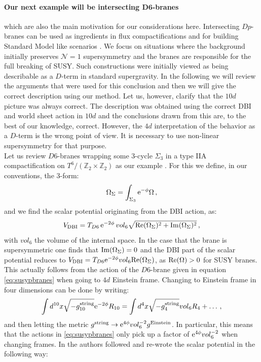\documentclass[a4paper,12pt,twoside,openright]{report}
\newcommand{\be}{\begin{equation}}
\newcommand{\ee}{\end{equation}}
\def\rme{{\rm e}}
\def\rmre{{\rm Re}}
\def\rmim{{\rm Im}}
\begin{document}
\paragraph{Our next example will be intersecting $\mathbf{D6}$-branes} which are also the main motivation for our considerations here. Intersecting $Dp$-branes can be used as ingredients in flux compactifications and for building Standard Model like scenarios \cite{Blumenhagen:2006ci,Blumenhagen:2005mu}. We focus on situations where the background initially preserves $\mathcal{N}=1$ supersymmetry and the branes are responsible for the full breaking of SUSY. Such constructions were initially viewed as being describable as a $D$-term in standard supergravity. In the following we will review the arguments that were used for this conclusion and then we will give the correct description using our method. Let us, however, clarify that the $10d$ picture was always correct. The description was obtained using the correct DBI and world sheet action in $10d$ and the conclusions drawn from this are, to the best of our knowledge, correct. However, the $4d$ interpretation of the behavior as a $D$-term is the wrong point of view. It is necessary to use non-linear supersymmetry for that purpose.\\
Let us review $D6$-branes wrapping some 3-cycle $\Sigma_3$ in a type IIA compactification on $T^6/(\mathbb{Z}_2 \times \mathbb{Z}_2)$ as our example \cite{Villadoro:2006ia}. For this we define, in our conventions, the 3-form:
\be 
\Omega_\Sigma = \int_{\Sigma_3} \rme^{-\phi} \Omega\,,
\ee
and we find the scalar potential originating from the DBI action, as:
\be 
V_{\text{DBI}} = T_{D6} \, \rme^{-2\phi} \, vol_6 \sqrt{\rmre (\Omega_\Sigma)^2 + \rmim (\Omega_\Sigma)^2}\,,
\label{eq:D6DBIact}
\ee
with $vol_6$ the volume of the internal space. In the case that the brane is supersymmetric one finds that $\rmim (\Omega_\Sigma) = 0$ and the DBI part of the scalar potential reduces to $V_{\text{DBI}} =T_{D6} \rme^{-2\phi} vol_6 \rmre (\Omega_\Sigma)$, as $\rmre (\Omega) > 0$ for SUSY branes. This actually follows from the action of the $D6$-brane given in equation \eqref{eq:susypbranes} when going to $4d$ Einstein frame. Changing to Einstein frame in four dimensions can be done by writing:
\be 
\int d^{10}x \sqrt{-g^{\text{string}}_{10}} \rme^{-2\phi} R_{10} = \int d^4x \sqrt{-g_4^{\text{string}}} vol_6 R_4 + \ldots\,,
\ee
and then letting the metric $g^{\text{string}} \to \rme^{4 \phi} vol_6^{-2} g^{\text{Einstein}}$. In particular, this means that the actions in \eqref{eq:susypbranes} only pick up a factor of $\rme^{4 \phi} vol_6^{-2}$ when changing frames. In \cite{Villadoro:2006ia} the authors followed \cite{Blumenhagen:2002wn} and re-wrote the scalar potential in the following way:
\end{document}
